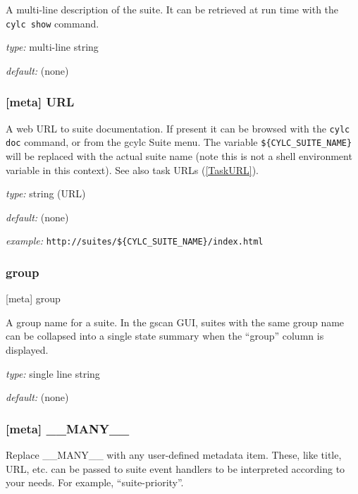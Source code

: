 A multi-line description of the suite. It can be retrieved at run time with the
\lstinline=cylc show= command.

\begin{myitemize}
\item {\em type:} multi-line string
\item {\em default:} (none)
\end{myitemize}

\subsubsection[URL]{ [meta] \textrightarrow URL}
\label{SuiteURL}

A web URL to suite documentation.  If present it can be browsed with the
\lstinline=cylc doc= command, or from the gcylc Suite menu.  The variable
\lstinline=${CYLC_SUITE_NAME}= will be replaced with the actual suite name
(note this is not a shell environment variable in this context). See also
task URLs (\ref{TaskURL}).

\begin{myitemize}
\item {\em type:} string (URL)
\item {\em default:} (none)
\item {\em example:} \lstinline=http://suites/${CYLC_SUITE_NAME}/index.html=
\end{myitemize}

\subsubsection{group}{ [meta] \textrightarrow group}

A group name for a suite. In the gscan GUI, suites with the same group name can
be collapsed into a single state summary when the ``group'' column is displayed.

\begin{myitemize}
\item {\em type:} single line string
\item {\em default:} (none)
\end{myitemize}

\subsubsection[\_\_MANY\_\_]{ [meta] \textrightarrow \_\_MANY\_\_}

Replace \_\_MANY\_\_ with any user-defined metadata item. These, like title, URL, etc. can be passed
to suite event handlers to be interpreted according to your needs. For example, ``suite-priority''.

